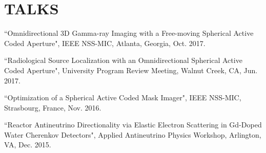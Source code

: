 \section{\small{TALKS}}

 \begin{thebibliography}{3}
 \raggedright
 \vspace{10pt}

 ``Omnidirectional 3D Gamma-ray Imaging with a Free-moving Spherical Active Coded Aperture", IEEE NSS-MIC, Atlanta, Georgia, Oct. 2017.
 
  ``Radiological Source Localization with an Omnidirectional Spherical Active Coded Aperture", University Program Review Meeting, Walnut Creek, CA, Jun. 2017.
 
  ``Optimization of a Spherical Active Coded Mask Imager", IEEE NSS-MIC, Strasbourg, France, Nov. 2016.

 ``Reactor Antineutrino Directionality via Elastic Electron Scattering in Gd-Doped Water Cherenkov Detectors", Applied Antineutrino Physics Workshop, Arlington, VA, Dec. 2015.

 \end{thebibliography}
